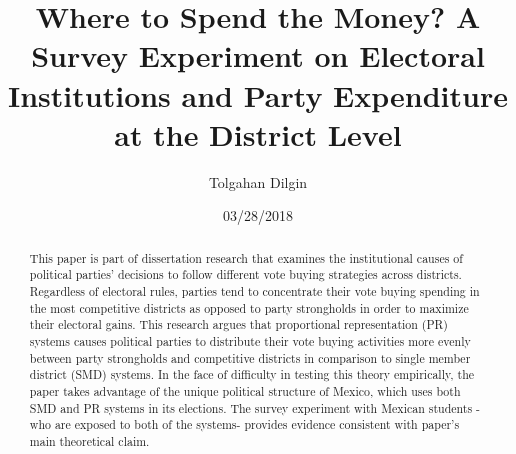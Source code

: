 \documentclass{article}
\begin{document}

	\title{Where to Spend the Money? A Survey Experiment on Electoral Institutions and Party Expenditure at the District Level}
	\author{Tolgahan Dilgin}
	\date{03/28/2018}
	\maketitle
	
\begin{abstract}
This paper is part of dissertation research that examines the institutional causes of political parties' decisions to follow different vote buying strategies across districts. Regardless of electoral rules, parties tend to concentrate their vote buying spending in the most competitive districts as opposed to party strongholds in order to maximize their electoral gains. This research argues that proportional representation (PR) systems causes political parties to distribute their vote buying activities more evenly between party strongholds and competitive districts in comparison to single member district (SMD) systems. In the face of difficulty in testing this theory empirically, the paper takes advantage of the unique political structure of Mexico, which uses both SMD and PR systems in its elections. The survey experiment with Mexican students -who are exposed to both of the systems- provides evidence consistent with paper's main theoretical claim.
\end{abstract}
\end{document}
